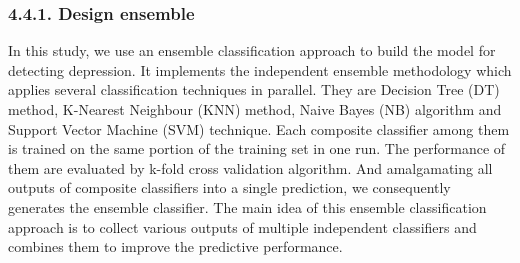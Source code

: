 \documentclass[runningheads]{llncs}
\begin{document}
\subsubsection{4.4.1. Design ensemble}
In this study, we use an ensemble classification approach to build the model for detecting depression. It implements the independent ensemble methodology which applies several classification techniques in parallel. They are Decision Tree (DT) method, K-Nearest Neighbour (KNN) method, Naive Bayes (NB) algorithm and Support Vector Machine (SVM) technique. Each composite classifier among them is trained on the same portion of the training set in one run. The performance of them are evaluated by k-fold cross validation algorithm. And amalgamating all outputs of composite classifiers into a single prediction, we consequently generates the ensemble classifier. The main idea of this ensemble classification approach is to collect various outputs of multiple independent classifiers and combines them to improve the predictive performance. 
%
\end{document}
